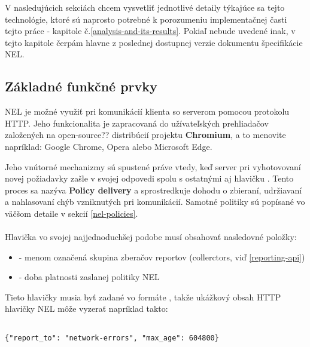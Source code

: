 V nasledujúcich sekciách chcem vysvetliť jednotlivé detaily týkajúce sa tejto technológie, ktoré sú naprosto potrebné k porozumeniu 
implementačnej časti tejto práce - kapitole č.\ref{analysis-and-its-results}. Pokiaľ nebude uvedené inak, v tejto kapitole čerpám hlavne 
z poslednej dostupnej verzie dokumentu špecifikácie NEL\cite{W3C-NEL}.

\subsection{Základné funkčné prvky}

NEL je možné využiť pri komunikácií klienta so serverom pomocou protokolu HTTP. Jeho funkcionalita je zapracovaná do užívateľských 
prehliadačov založených na open-source?? distribúcií projektu \textbf{Chromium}, a to menovite napríklad: Google Chrome, Opera alebo 
Microsoft Edge. 

Jeho vnútorné mechanizmy sú spustené práve vtedy, keď server pri vyhotovovaní novej požiadavky zašle v svojej odpovedi spolu s ostatnými 
aj hlavičku . Tento proces sa nazýva \textbf{Policy delivery} a sprostredkuje dohodu o zbieraní, udržiavaní a nahlasovaní chýb 
vzniknutých pri komunikácií. Samotné politiky sú popísané vo väčšom detaile v sekcií \ref{nel-policies}.
\\
\\
Hlavička  vo svojej najjednoduchšej podobe musí obsahovať nasledovné položky: 

\begin{itemize}
    \item {} - menom označená skupina zberačov reportov (collerctors, viď \ref{reporting-api}) 
    \item {} - doba platnosti zaslanej politiky NEL
\end{itemize}

Tieto hlavičky musia byť zadané vo formáte , takže ukážkový obsah HTTP hlavičky NEL môže vyzerať 
napríklad takto:

\begin{lstlisting}[caption={Ukážka obsahu najjednoduchšej/minimálnej HTTP hlavičky NEL. Akékoľvek chyby budú hlásené do skupiny 
    \code{network-errors} po dobu platnosti tejto politiky, ktorá bola nastavená na 7 dní (604 800 / 60s / 60min / 24h)}]

{"report_to": "network-errors", "max_age": 604800}

\end{lstlisting}
\\

